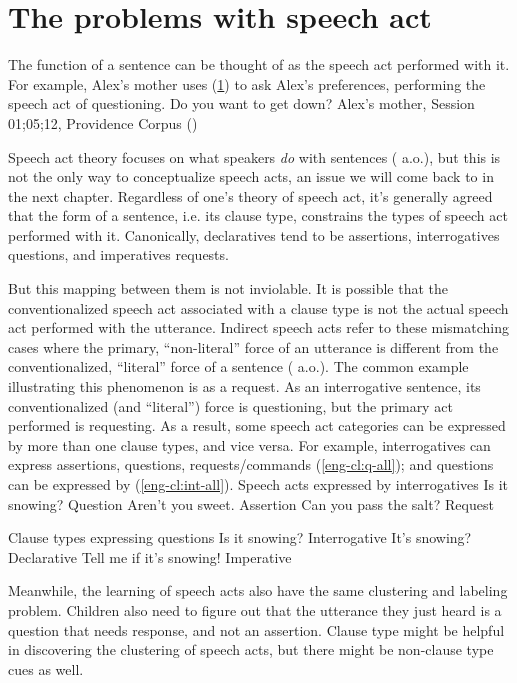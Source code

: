 \section{The problems with speech act}
The function of a sentence can be thought of as the speech act performed with it. For example, Alex's mother uses (\ref{}) to ask Alex's preferences, performing the speech act of questioning.
\bex{}
Do you want to get down? \hfill Alex's mother, Session 01;05;12, Providence Corpus (\cite{ProvidenceCorpus})
\eex

Speech act theory focuses on what speakers \emph{do} with sentences (\cite{austin1975things, searle1969} a.o.), but this is not the only way to conceptualize speech acts, an issue we will come back to in the next chapter. Regardless of one's theory of speech act, it's generally agreed that the form of a sentence, i.e. its clause type, constrains the types of speech act performed with it. Canonically, declaratives tend to be assertions, interrogatives questions, and imperatives requests. 


But this mapping between them is not inviolable. It is possible that the conventionalized speech act associated with a clause type is not the actual speech act performed with the utterance. Indirect speech acts refer to these mismatching cases where the primary, ``non-literal'' force of an utterance is different from the conventionalized, ``literal'' force of a sentence (\citealt{searle1975tax, searle1976class, bachharnish1979, levinson1983, searlevanderveken1985, portner2018, starr2014, murraystarr2020} a.o.). The common example illustrating this phenomenon is  as a request. As an interrogative sentence, its conventionalized (and ``literal'') force is questioning, but the primary act performed is requesting. As a result, some speech act categories can be expressed by more than one clause types, and vice versa. For example, interrogatives can express assertions, questions, requests/commands (\ref{eng-cl:q-all}); and questions can be expressed by \diis{} (\ref{eng-cl:int-all}).
Speech acts expressed by interrogatives 
\bxl Is it snowing? \hfill Question
\ex Aren't you sweet. \hfill Assertion
\ex Can you pass the salt? \hfill Request
\exl
\eex

Clause types expressing questions
\bxl
Is it snowing? \hfill Interrogative
\ex It's snowing? \hfill Declarative
\ex Tell me if it's snowing! \hfill Imperative
\exl
\eex


Meanwhile, the learning of speech acts also have the same clustering and labeling problem. Children also need to figure out that the utterance they just heard is a question that needs response, and not an assertion. Clause type might be helpful in discovering the clustering of speech acts, but there might be non-clause type cues as well. %


